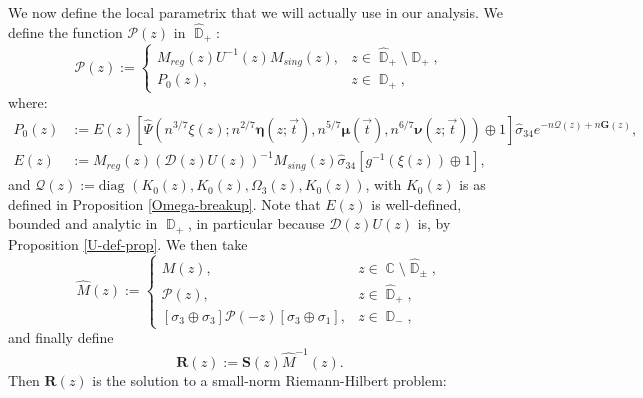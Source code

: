 \documentclass[usenames,dvipsnames]{article}
\theoremstyle{definition}
\DeclareMathOperator{\CC}{\mathbb{C}}
\DeclareMathOperator{\DD}{\mathbb{D}}
\numberwithin{equation}{section}
\numberwithin{figure}{section}
\begin{document}
We now define the local parametrix that we will actually use in our analysis. We define the function $\mathcal{P}(z)$ in $\hat{\DD}_+$:
    \begin{equation}
        \mathcal{P}(z) := 
        \begin{cases}
            M_{reg}(z)U^{-1}(z)M_{sing}(z), & z \in \hat{\DD}_+\setminus \DD_+,\\
            P_0(z), & z\in\DD_+,
        \end{cases}
    \end{equation}
where:
    \begin{align}
        P_0(z)&:=E(z)\left[\hat{\Psi}(n^{3/7}\xi(z);n^{2/7}\boldsymbol{\eta}(z;\vec{t}),n^{5/7}\boldsymbol{\mu}(\vec{t}),n^{6/7}\boldsymbol{\nu}(z;\vec{t})) \oplus 1\right]\hat{\sigma}_{34} e^{-n\mathcal{Q}(z) + n\boldsymbol{G}(z)},\\
        E(z) &:= M_{reg}(z)\left(\mathcal{D}(z)U(z)\right)^{-1}M_{sing}(z) \hat{\sigma}_{34} \left[ g^{-1}(\xi(z)) \oplus 1\right],
    \end{align}
and $\mathcal{Q}(z) := \text{diag }(K_0(z), K_0(z), \Omega_3(z),K_0(z))$, with $K_0(z)$ is as defined in Proposition \ref{Omega-breakup}. Note that
$E(z)$ is well-defined, bounded and analytic in $\DD_+$, in particular because $\mathcal{D}(z)U(z)$ is, by Proposition \ref{U-def-prop}. We then
take
    \begin{equation}
        \hat{M}(z) := 
        \begin{cases}
            M(z), & z\in \CC\setminus \hat{\DD}_{\pm},\\
            \mathcal{P}(z), & z\in \hat{\DD}_+,\\
            [\sigma_3 \oplus \sigma_3]\mathcal{P}(-z)[\sigma_3 \oplus \sigma_1], & z\in \DD_-,
        \end{cases}
    \end{equation}
and finally define
    \begin{equation}
        \boldsymbol{R}(z) := \boldsymbol{S}(z)\hat{M}^{-1}(z).
    \end{equation}
Then $\boldsymbol{R}(z)$ is the solution to a small-norm Riemann-Hilbert problem:
\end{document}
